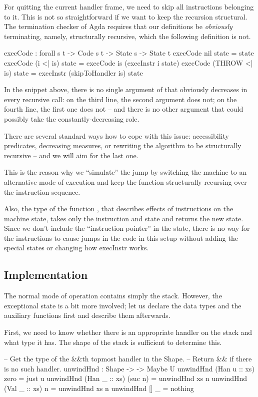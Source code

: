 For quitting the current handler frame, we need to skip all instructions
belonging to it. This is not so straightforward if we want to keep the
recursion structural. The termination checker of Agda requires that our
definitions be \emph{obviously} terminating, namely, structurally recursive,
which the following definition is not.
\begin{code}
  execCode : forall {s t} -> Code s t -> State s -> State t
  execCode nil state = state
  execCode (i <| is) state = execCode is (execInstr i state)
  execCode (THROW <| is) state = execInstr (skipToHandler is) state
\end{code}
In the snippet above, there is no single argument of  that
obviously decreases in every recursive call: on the third line, the second
argument does not; on the fourth line, the first one does not -- and there
is no other argument that could possibly take the constantly-decreasing role.

There are several standard ways how to cope with this issue: accessibility
predicates, decreasing measures, or rewriting the algorithm to be
structurally recursive -- and we will aim for the last one.

This is the reason why we ``simulate'' the jump by switching the machine to an
alternative mode of execution and keep the function 
structurally recursing over the instruction sequence.

Also, the type of the function , that describes effects of
instructions on the machine state, takes only the instruction and state and
returns the new state. Since we don't include the ``instruction pointer'' in
the state, there is no way for the instructions to cause jumps in the code in
this setup without adding the special states or changing how execInstr works.


\subsection{Implementation}

The normal mode of operation contains simply the stack. However, the exceptional state
is a bit more involved; let us declare the data types and the auxiliary functions first
and describe them afterwards.

First, we need to know whether there is an appropriate handler on the stack and what type
it has. The shape of the stack is sufficient to determine this.
\begin{code}
  -- Get the type of the &&\-th top\-most handler in the Shape.
  -- Return && if there is no such handler.
  unwindHnd : Shape -> \bN -> Maybe U
  unwindHnd (Han u :: xs) zero    = just u
  unwindHnd (Han _ :: xs) (suc n) = unwindHnd xs n
  unwindHnd (Val _ :: xs) n       = unwindHnd xs n
  unwindHnd []           _       = nothing
\end{code}

